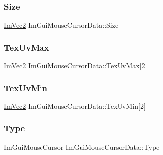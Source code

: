 \hypertarget{struct_im_gui_mouse_cursor_data_af8dd3ec3de77811d6caf4bfdde085495}{}\label{struct_im_gui_mouse_cursor_data_af8dd3ec3de77811d6caf4bfdde085495} 
\subsubsection{\texorpdfstring{Size}{Size}}
{\footnotesize\ttfamily \hyperlink{struct_im_vec2}{Im\+Vec2} Im\+Gui\+Mouse\+Cursor\+Data\+::\+Size}

\hypertarget{struct_im_gui_mouse_cursor_data_a30bae90a9e61608c4fd9fe03b5f7390f}{}\label{struct_im_gui_mouse_cursor_data_a30bae90a9e61608c4fd9fe03b5f7390f} 
\subsubsection{\texorpdfstring{Tex\+Uv\+Max}{TexUvMax}}
{\footnotesize\ttfamily \hyperlink{struct_im_vec2}{Im\+Vec2} Im\+Gui\+Mouse\+Cursor\+Data\+::\+Tex\+Uv\+Max\mbox{[}2\mbox{]}}

\hypertarget{struct_im_gui_mouse_cursor_data_add35adb991fcfd03ae33c3607aa0c842}{}\label{struct_im_gui_mouse_cursor_data_add35adb991fcfd03ae33c3607aa0c842} 
\subsubsection{\texorpdfstring{Tex\+Uv\+Min}{TexUvMin}}
{\footnotesize\ttfamily \hyperlink{struct_im_vec2}{Im\+Vec2} Im\+Gui\+Mouse\+Cursor\+Data\+::\+Tex\+Uv\+Min\mbox{[}2\mbox{]}}

\hypertarget{struct_im_gui_mouse_cursor_data_ab58df812a8caf8741415053515b8f347}{}\label{struct_im_gui_mouse_cursor_data_ab58df812a8caf8741415053515b8f347} 
\subsubsection{\texorpdfstring{Type}{Type}}
{\footnotesize\ttfamily Im\+Gui\+Mouse\+Cursor Im\+Gui\+Mouse\+Cursor\+Data\+::\+Type}

